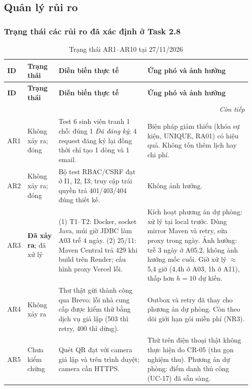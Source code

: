 \subsection{Quản lý rủi ro}
\label{sec:t3-risk}

\subsubsection{Trạng thái các rủi ro đã xác định ở Task 2.8}

\begingroup\footnotesize
\renewcommand{\arraystretch}{1.15}
\begin{longtable}{@{}p{.06\linewidth}p{.12\linewidth}p{.38\linewidth}p{.36\linewidth}@{}}
\caption{Trạng thái AR1--AR10 tại 27/11/2026}\label{tab:t3-risk-status}\\
\toprule
\textbf{ID} & \textbf{Trạng thái} & \textbf{Diễn biến thực tế} & \textbf{Ứng phó và ảnh hưởng}\\\midrule\endfirsthead
\toprule
\textbf{ID} & \textbf{Trạng thái} & \textbf{Diễn biến thực tế} & \textbf{Ứng phó và ảnh hưởng}\\\midrule\endhead
\midrule\multicolumn{4}{r}{\textit{Còn tiếp}}\\\endfoot
\bottomrule\endlastfoot
AR1 & Không xảy ra; đóng & Test 6 sinh viên tranh 1 chỗ: đúng 1 \textit{Đã đăng ký}; 4 request đăng ký lại đồng thời chỉ tạo 1 dòng và 1 email. & Biện pháp giảm thiểu (khóa sự kiện, UNIQUE, RA01) có hiệu quả. Không tốn thêm lịch hay chi phí.\\
AR2 & Không xảy ra; đóng & Bộ test RBAC/CSRF đạt ở I1, I2, I3; truy cập trái quyền trả 401/403/404 đúng thiết kế. & Không ảnh hưởng.\\
AR3 & \textbf{Đã xảy ra}; đã xử lý & (1) T1--T2: Docker, socket Java, múi giờ JDBC làm A03 trễ 4 ngày. (2) 25/11: Maven Central trả 429 khi build trên Render; cấu hình proxy Vercel lỗi. & Kích hoạt phương án dự phòng: xử lý tại local trước. Dùng mirror Maven và retry, sửa proxy trong ngày. Ảnh hưởng: trễ 3 ngày ở A05.2, không ảnh hưởng mốc cuối. Giờ xử lý $\approx$ 5,4 giờ (4,4h ở A03, 1h ở A11), thấp hơn $h = 10$ dự kiến.\\
AR4 & Không xảy ra & Thư thật gửi thành công qua Brevo; lỗi nhà cung cấp được kiểm thử bằng dịch vụ giả lập (503 thì retry, 400 thì dừng). & Outbox và retry đã thay cho phương án dự phòng. Còn theo dõi giới hạn gói miễn phí (NR3).\\
AR5 & Chưa kiểm chứng & Quét QR đạt với camera giả lập và trên trình duyệt; camera cần HTTPS. & Thử trên điện thoại thật không thực hiện do CR-05 (thu gọn nghiệm thu). Phương án dự phòng: điểm danh thủ công (UC-17) đã sẵn sàng.\\

\end{longtable}
